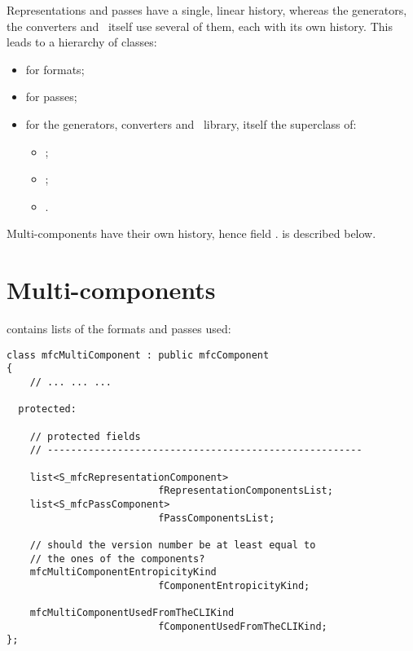 Representations and passes have a single, linear history, whereas the generators, the converters and \mf\ itself use several of them, each with its own history. This leads to a hierarchy of classes:
\begin{itemize}
\item {} for formats;
\item {} for passes;
\item {} for the generators, converters and \mf\ library, itself the superclass of:


\begin{itemize}
	\item {};
	\item {};
	\item {}.
	\end{itemize}

\end{itemize}

Multi-components have their own history, hence field .
 is described below.


\section{Multi-components}\label{Multi-components}

 contains lists of the formats and passes used:
\begin{lstlisting}[language=CPlusPlus]
class mfcMultiComponent : public mfcComponent
{
	// ... ... ...

  protected:

    // protected fields
    // ------------------------------------------------------

    list<S_mfcRepresentationComponent>
                          fRepresentationComponentsList;
    list<S_mfcPassComponent>
                          fPassComponentsList;

    // should the version number be at least equal to
    // the ones of the components?
    mfcMultiComponentEntropicityKind
                          fComponentEntropicityKind;

    mfcMultiComponentUsedFromTheCLIKind
                          fComponentUsedFromTheCLIKind;
};
\end{lstlisting}

